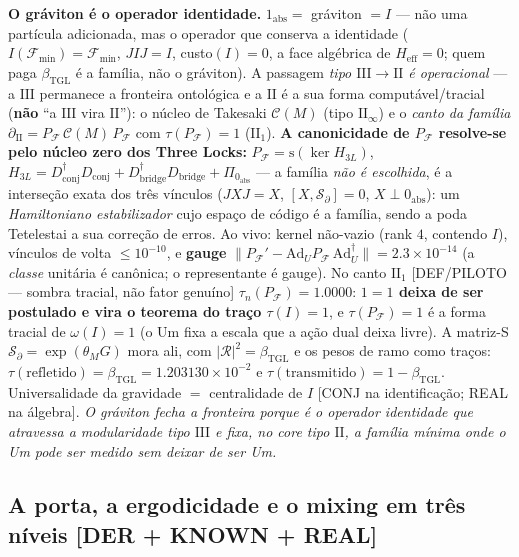 \documentclass[11pt]{article}
\newcommand{\bTGL}{\beta_{\mathrm{TGL}}}\newcommand{\Msun}{M_{\odot}}\newcommand{\TGL}{\mathrm{TGL}}
\theoremstyle{definition}\newtheorem{deriv}{Derivação}
\begin{document}
\textbf{O gráviton é o operador identidade.} $1_{\mathrm{abs}}=$ gráviton $=I$ --- não uma partícula adicionada, mas o operador que conserva a identidade ($I(\mathcal F_{\min})=\mathcal F_{\min}$, $JIJ=I$, custo$(I)=0$, a face algébrica de $H_{\mathrm{eff}}=0$; quem paga $\bTGL$ é a família, não o gráviton). A passagem \emph{tipo $\mathrm{III}\to\mathrm{II}$ é operacional} --- a $\mathrm{III}$ permanece a fronteira ontológica e a $\mathrm{II}$ é a sua forma computável/tracial (\textbf{não} ``a $\mathrm{III}$ vira $\mathrm{II}$''): o núcleo de Takesaki $\mathcal C(M)$ (tipo $\mathrm{II}_\infty$) e o \emph{canto da família} $\partial_{\mathrm{II}}=P_{\mathcal F}\,\mathcal C(M)\,P_{\mathcal F}$ com $\tau(P_{\mathcal F})=1$ ($\mathrm{II}_1$). \textbf{A canonicidade de $P_{\mathcal F}$ resolve-se pelo núcleo zero dos Three Locks:} $P_{\mathcal F}=\mathrm{s}(\ker H_{3L})$, $H_{3L}=D_{\mathrm{conj}}^{\dagger}D_{\mathrm{conj}}+D_{\mathrm{bridge}}^{\dagger}D_{\mathrm{bridge}}+\Pi_{0_{\mathrm{abs}}}$ --- a família \emph{não é escolhida}, é a interseção exata dos três vínculos ($JXJ=X$, $[X,\mathcal S_\partial]=0$, $X\perp 0_{\mathrm{abs}}$): um \emph{Hamiltoniano estabilizador} cujo espaço de código é a família, sendo a poda Tetelestai a sua correção de erros. Ao vivo: kernel não-vazio (rank $4$, contendo $I$), vínculos de volta $\le10^{-10}$, e \textbf{gauge} $\|P_{\mathcal F}'-\mathrm{Ad}_U P_{\mathcal F}\,\mathrm{Ad}_U^{\dagger}\|=2.3\times10^{-14}$ (a \emph{classe} unitária é canônica; o representante é gauge). No canto $\mathrm{II}_1$ \textsf{[DEF/PILOTO --- sombra tracial, não fator genuíno]} $\tau_n(P_{\mathcal F})=1.0000$: \textbf{$1=1$ deixa de ser postulado e vira o teorema do traço $\tau(I)=1$}, e $\tau(P_{\mathcal F})=1$ é a forma tracial de $\omega(I)=1$ (o Um fixa a escala que a ação dual deixa livre). A matriz-S $\mathcal S_\partial=\exp(\theta_M G)$ mora ali, com $|\mathcal R|^2=\bTGL$ e os pesos de ramo como traços: $\tau(\text{refletido})=\bTGL=1.203130\times10^{-2}$ e $\tau(\text{transmitido})=1-\bTGL$. Universalidade da gravidade $=$ centralidade de $I$ \textsf{[CONJ na identificação; REAL na álgebra]}. \emph{O gráviton fecha a fronteira porque é o operador identidade que atravessa a modularidade tipo $\mathrm{III}$ e fixa, no core tipo $\mathrm{II}$, a família mínima onde o Um pode ser medido sem deixar de ser Um.}

\subsection*{A porta, a ergodicidade e o mixing em três níveis \textsf{[DER + KNOWN + REAL]}}
\end{document}
